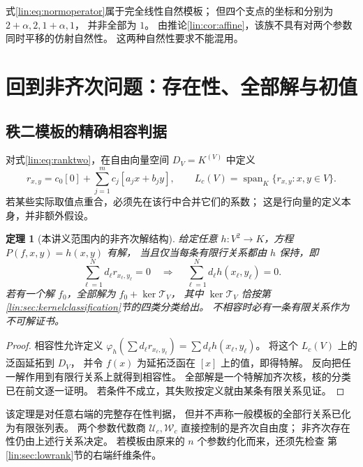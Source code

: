 \documentclass[11pt,a4paper,oneside,openany]{book}
\theoremstyle{lecture}
\newtheorem{theorem}{定理}[section]
\newcommand{\Span}{\operatorname{span}}
\newcommand{\T}{\mathcal T}
\newcommand{\Uc}{\mathscr U_c}
\newcommand{\Wc}{\mathscr W_c}
\numberwithin{equation}{section}
\begin{document}
式\eqref{lin:eq:normoperator}属于完全线性自然模板；
但四个支点的坐标和分别为 $2+\alpha,2,1+\alpha,1$，
并非全部为 $1$。
由推论\ref{lin:cor:affine}，该族不具有对两个参数同时平移的仿射自然性。
这两种自然性要求不能混用。

\section{回到非齐次问题：存在性、全部解与初值}\label{lin:sec:inhomfinal}
\subsection{秩二模板的精确相容判据}
对式\eqref{lin:eq:ranktwo}，在自由向量空间 $D_V=K^{(V)}$ 中定义
\[
 r_{x,y}=c_0[0]+\sum_{j=1}^m c_j[a_jx+b_jy],\qquad
 L_c(V)=\Span_K\{r_{x,y}:x,y\in V\}.
\]
若某些实际取值点重合，必须先在该行中合并它们的系数；
这是行向量的定义本身，并非额外假设。

\begin{theorem}[本讲义范围内的非齐次解结构]\label{lin:thm:inhomfinal}
给定任意 $h:V^2\to K$，方程 $P(f,x,y)=h(x,y)$ 有解，
当且仅当每条有限行关系都由 $h$ 保持，即
\[
 \sum_{\ell=1}^N d_\ell r_{x_\ell,y_\ell}=0
 \quad\Longrightarrow\quad
 \sum_{\ell=1}^N d_\ell h(x_\ell,y_\ell)=0.
\]
若有一个解 $f_0$，全部解为 $f_0+\ker\T_V$，
其中 $\ker\T_V$ 恰按第\ref{lin:sec:kernelclassification}节的四类分类给出。
不相容时必有一条有限关系作为不可解证书。
\end{theorem}
\begin{proof}
相容性允许定义
$\varphi_h(\sum d_\ell r_{x_\ell,y_\ell})
=\sum d_\ell h(x_\ell,y_\ell)$。
将这个 $L_c(V)$ 上的泛函延拓到 $D_V$，
并令 $f(x)$ 为延拓泛函在 $[x]$ 上的值，即得特解。
反向把任一解作用到有限行关系上就得到相容性。
全部解是一个特解加齐次核，核的分类已在前文逐一证明。
若条件不成立，其失败按定义就由某条有限关系见证。
\end{proof}

该定理是对任意右端的完整存在性判据，
但并不声称一般模板的全部行关系已化为有限张列表。
两个参数代数商 $\Uc,\Wc$ 直接控制的是齐次自由度；
非齐次存在性仍由上述行关系决定。
若模板由原来的 $n$ 个参数约化而来，还须先检查
第\ref{lin:sec:lowrank}节的右端纤维条件。
\end{document}
